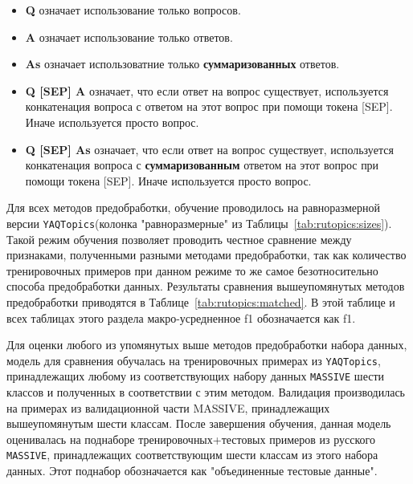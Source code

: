 \begin{itemize}
    \item \textbf{Q} означает использование только вопросов.
    \item \textbf{A} означает использование только ответов.
    \item \textbf{As} означает использоватние только \textbf{суммаризованных} ответов.
    \item \textbf{Q [SEP] A} означает, что если ответ на вопрос существует, используется конкатенация вопроса с ответом на этот вопрос при помощи токена [SEP]. Иначе используется просто вопрос. 
    \item \textbf{Q [SEP] As} означает, что если ответ на вопрос существует, используется конкатенация вопроса с \textbf{суммаризованным} ответом на этот вопрос при помощи токена [SEP]. Иначе используется просто вопрос. 
\end{itemize}

Для всех методов предобработки, обучение проводилось на равноразмерной версии \texttt{YAQTopics}(колонка "равноразмерные" из Таблицы~\ref{tab:rutopics:sizes}).
Такой режим обучения позволяет проводить честное сравнение между признаками, полученными разными методами предобработки, так как количество тренировочных примеров при данном режиме то же самое безотносительно способа предобработки данных. Результаты сравнения вышеупомянутых методов предобработки приводятся в Таблице~\ref{tab:rutopics:matched}. В этой таблице и всех таблицах этого раздела макро-усредненное f1 обозначается как f1.
 
Для оценки любого из упомянутых выше методов предобработки набора данных, модель для сравнения обучалась на тренировочных примерах из \texttt{YAQTopics}, принадлежащих любому из соответствующих набору данных \texttt{MASSIVE} шести классов и полученных в соответствии с этим методом. Валидация производилась на примерах из валидационной части MASSIVE, принадлежащих вышеупомянутым шести классам. После завершения обучения, данная модель оценивалась на поднаборе тренировочных+тестовых примеров из русского \texttt{MASSIVE}, принадлежащих соответствующим шести классам из этого набора данных. Этот поднабор обозначается как "объединенные тестовые данные". 

